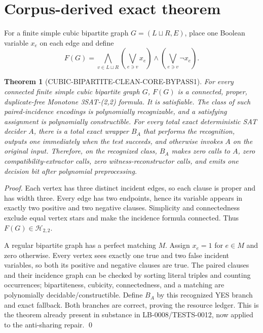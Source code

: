\documentclass[11pt]{article}
\newtheorem{theorem}{Theorem}
\newcommand{\Htwo}{\mathcal H_{2,2}}
\begin{document}
\section{Corpus-derived exact theorem}

For a finite simple cubic bipartite graph \(G=(L\sqcup R,E)\), place one
Boolean variable \(x_e\) on each edge and define
\[
 F(G)=\bigwedge_{v\in L\sqcup R}
 \left(\bigvee_{e\ni v}x_e\right)
 \wedge
 \left(\bigvee_{e\ni v}\neg x_e\right).
\]

\begin{theorem}[CUBIC-BIPARTITE-CLEAN-CORE-BYPASS1]
For every connected finite simple cubic bipartite graph \(G\), \(F(G)\) is a
connected, proper, duplicate-free Monotone 3SAT-(2,2) formula.  It is
satisfiable.  The class of such paired-incidence encodings is polynomially
recognizable, and a satisfying assignment is polynomially constructible.
For every total exact deterministic SAT decider \(A\), there is a total exact
wrapper \(B_A\) that performs the recognition, outputs one immediately when
the test succeeds, and otherwise invokes \(A\) on the original input.
Therefore, on the recognized class, \(B_A\) makes zero calls to \(A\), zero
compatibility-extractor calls, zero witness-reconstructor calls, and emits one
decision bit after polynomial preprocessing.
\end{theorem}

\begin{proof}
Each vertex has three distinct incident edges, so each clause is proper and
has width three.  Every edge has two endpoints, hence its variable appears in
exactly two positive and two negative clauses.  Simplicity and connectedness
exclude equal vertex stars and make the incidence formula connected.  Thus
\(F(G)\in\Htwo\).

A regular bipartite graph has a perfect matching \(M\).  Assign \(x_e=1\) for
\(e\in M\) and zero otherwise.  Every vertex sees exactly one true and two
false incident variables, so both its positive and negative clauses are true.
The paired clauses and their incidence graph can be checked by sorting literal
triples and counting occurrences; bipartiteness, cubicity, connectedness, and
a matching are polynomially decidable/constructible.  Define \(B_A\) by this
recognized YES branch and exact fallback.  Both branches are correct, proving
the resource ledger.  This is the theorem already present in substance in
LB-0008/TESTS-0012, now applied to the anti-sharing repair. \qed
\end{proof}
\end{document}
